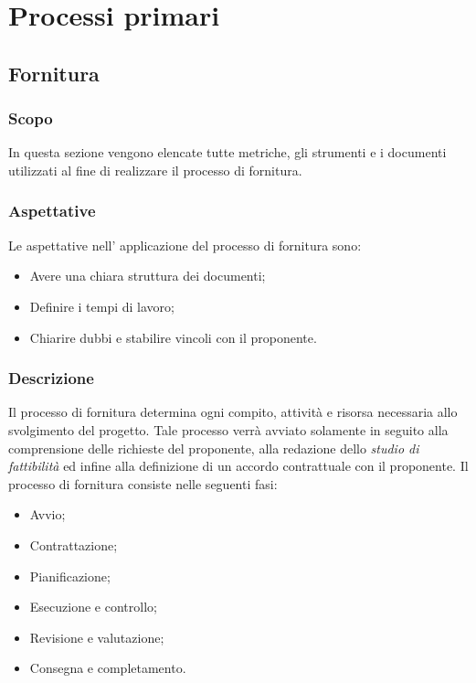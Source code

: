 
\section{Processi primari}\label{section:Processi_primari}
\subsection{Fornitura} \label{subsection:Fornitura}
\subsubsection{Scopo}\label{subsubsection: scopo_fornitura}
In questa sezione vengono elencate tutte metriche, gli strumenti e i documenti utilizzati al fine di realizzare il processo di fornitura.
\subsubsection{Aspettative}\label{subsubsection: aspettative_fornitura}
Le aspettative nell' applicazione del processo di fornitura sono:
\begin {itemize}
    \item Avere una chiara struttura dei documenti;
    \item Definire i tempi di lavoro;
    \item Chiarire dubbi e stabilire vincoli con il proponente.
\end {itemize}
\subsubsection{Descrizione}\label{subsubsection: descrizione_fornitura}
Il processo di fornitura determina ogni compito, attività e risorsa necessaria allo svolgimento del progetto.
Tale processo verrà avviato solamente in seguito alla comprensione delle richieste del proponente, alla redazione dello \textit{studio di fattibilità} ed infine alla definizione di un accordo contrattuale con il proponente.
Il processo di fornitura consiste nelle seguenti fasi:
\begin {itemize}
    \item Avvio;
    \item Contrattazione;
    \item Pianificazione;
    \item Esecuzione e controllo;
    \item Revisione e valutazione;
    \item Consegna e completamento.
\end {itemize}
